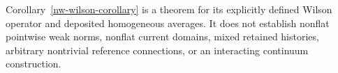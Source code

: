 Corollary~\ref{nw-wilson-corollary} is a theorem for its explicitly
defined Wilson operator and deposited homogeneous averages.
It does not establish nonflat pointwise weak norms, nonflat current
domains, mixed retained histories, arbitrary nontrivial reference
connections, or an interacting continuum construction.
